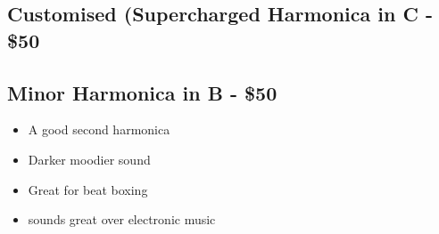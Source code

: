         \subsection*{Customised (Supercharged Harmonica in C - \$50}
            \begin{itemize}
            \end{itemize}
            
        \subsection*{Minor Harmonica in B - \$50}
            \begin{itemize}
                \item A good second harmonica
                \item Darker moodier sound
                \item Great for beat boxing
                \item sounds great over electronic music
            \end{itemize} 
